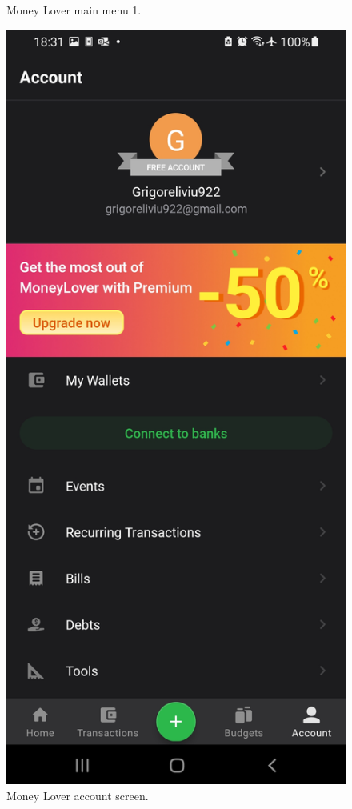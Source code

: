 \begin{figure}[htbp]
\begin{minipage}[b]{0.27\textwidth}
    \caption{Money Lover main menu 1.}
    \label{fig:image1}
  \end{minipage}
  \hfill
  \begin{minipage}[b]{0.27\textwidth}
    \includegraphics[width=\textwidth]{Screen Shots/MoneyLover/Account.jpg}
    \caption{Money Lover account screen.}
    \label{fig:image2}
  \end{minipage}
\end{figure}
\newpage




